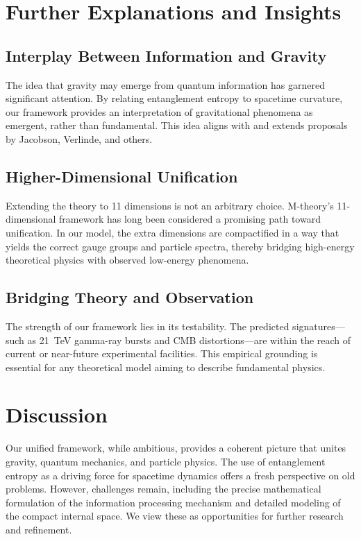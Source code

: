 \documentclass[12pt, a4paper]{article}
\begin{document}
\section{Further Explanations and Insights}
\subsection{Interplay Between Information and Gravity}
The idea that gravity may emerge from quantum information has garnered significant attention. By relating entanglement entropy to spacetime curvature, our framework provides an interpretation of gravitational phenomena as emergent, rather than fundamental. This idea aligns with and extends proposals by Jacobson, Verlinde, and others.

\subsection{Higher-Dimensional Unification}
Extending the theory to 11 dimensions is not an arbitrary choice. M-theory’s 11-dimensional framework has long been considered a promising path toward unification. In our model, the extra dimensions are compactified in a way that yields the correct gauge groups and particle spectra, thereby bridging high-energy theoretical physics with observed low-energy phenomena.

\subsection{Bridging Theory and Observation}
The strength of our framework lies in its testability. The predicted signatures—such as 21~TeV gamma-ray bursts and CMB distortions—are within the reach of current or near-future experimental facilities. This empirical grounding is essential for any theoretical model aiming to describe fundamental physics.

\section{Discussion}
Our unified framework, while ambitious, provides a coherent picture that unites gravity, quantum mechanics, and particle physics. The use of entanglement entropy as a driving force for spacetime dynamics offers a fresh perspective on old problems. However, challenges remain, including the precise mathematical formulation of the information processing mechanism and detailed modeling of the compact internal space. We view these as opportunities for further research and refinement.
\end{document}
